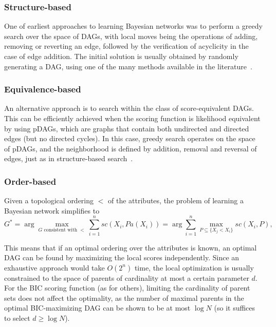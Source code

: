 \subsubsection{Structure-based}
\label{subsub:structurebased}
One of earliest approaches to learning Bayesian networks was to perform a greedy search over the space of DAGs, with local moves being the operations of adding, removing or reverting an edge, followed by the verification of acyclicity in the case of edge addition. The initial solution is usually obtained by randomly generating a DAG, using one of the many methods available in the literature~\cite{GH08}.

\subsubsection{Equivalence-based}
\label{subsub:equivalencebased}

An alternative approach is to search within the class of score-equivalent DAGs. This can be efficiently achieved when the scoring function is likelihood equivalent by using pDAGs, which are graphs that contain both undirected and directed edges (but no directed cycles). In this case, greedy search operates on the space of pDAGs, and the neighborhood is defined by addition, removal and reversal of edges, just as in structure-based search~\cite{Maxwell96,Maxwell02}.

\subsubsection{Order-based}
\label{subsub:orderbased}
Given a topological ordering $<$ of the attributes, the problem of learning a Bayesian network simplifies to 
	\begin{equation}
		\label{eq:orderreduced}
		G^* = \arg\max_{G \text{ consistent with } <} \sum_{i=1}^{n} {sc}( X_i , {Pa}( X_i ) ) = \arg \sum_{i=1}^{n} \max_{P \subseteq \{ X_j < X_i \}} {sc}( X_i , P ) ,
	\end{equation}

This means that if an optimal ordering over the attributes is known, an optimal DAG can be found by maximizing the local scores independently. Since an exhaustive approach would take $O(2^n)$ time, the local optimization is usually constrained to the space of parents of cardinality at most a certain parameter $d$. For the BIC scoring function (as for others), limiting the cardinality of parent sets does not affect the optimality, as the number of maximal parents in the optimal BIC-maximizing DAG can be shown to be at most $\log N$ (so it
suffices to select $d \geq \log N$). %

